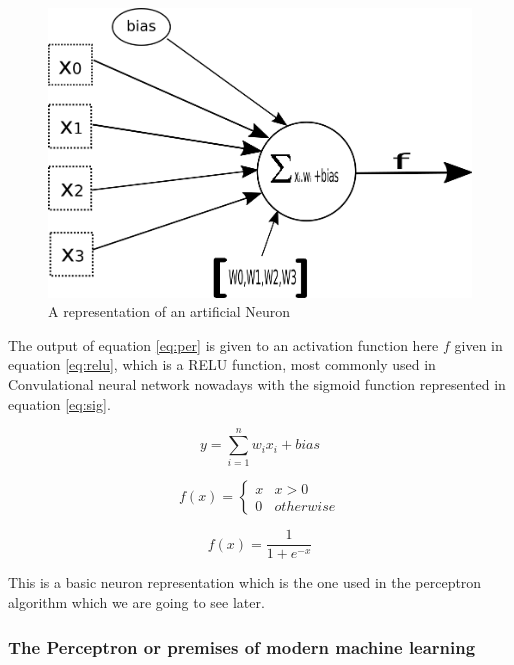 \begin{figure}[h!]
   \centerline{\includegraphics[scale=0.35]{./pics/ArtificialNeuron.png}}
   \caption{A representation of an artificial Neuron }
   \label{fig:artneuron}
\end{figure}

The output of equation \ref{eq:per} is given to an activation function here $f$ given in equation \ref{eq:relu}, which is a RELU function, most commonly used in Convulational neural network nowadays with the sigmoid function represented in equation \ref{eq:sig}. 

\begin{equation}
    y = \sum\limits_{i=1}^n w_ix_i  + bias
    \label{eq:per}
\end{equation}

\begin{equation}
    f(x) = 
 \begin{cases} 
      x & x >0 \\
      0 & otherwise
   \end{cases}
    \label{eq:relu}
\end{equation}

\begin{equation}
    f(x) = \frac{1}{1+ e^{-x}}
    \label{eq:sig}
\end{equation}


This is a basic neuron representation which is the one used in the perceptron algorithm \cite{Rosenblatt58theperceptron} which we are going to see later.

\subsubsection{The Perceptron or premises of modern machine learning}

